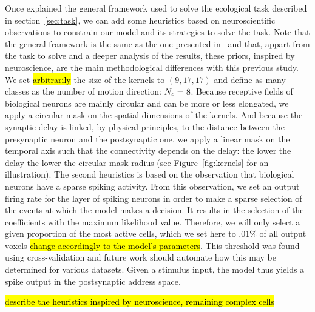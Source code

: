 \documentclass[default]{sn-jnl}%
\theoremstyle{thmstyleone}%
\theoremstyle{thmstyletwo}%
\theoremstyle{thmstylethree}%
\newcommand{\note}[1]{{\sethlcolor{yellow}\hl{#1}}}
\begin{document}
Once explained the general framework used to solve the ecological task described in section~\ref{sec:task}, we can add some heuristics based on neuroscientific observations to constrain our model and its strategies to solve the task. Note that the general framework is the same as the one presented in~\cite{grimaldi_learning_2022} and that, appart from the task to solve and a deeper analysis of the results, these priors, inspired by neuroscience, are the main methodological differences with this previous study. We set \note{arbitrarily} the size of the kernels to $(9, 17, 17)$ and define as many classes as the number of motion direction: $N_c = 8$. Because receptive fields of biological neurons are mainly circular and can be more or less elongated, we apply a circular mask on the spatial dimensions of the kernels. And because the synaptic delay is linked, by physical principles, to the distance between the presynaptic neuron and the postsynaptic one, we apply a linear mask on the temporal axis such that the connectivity depends on the delay: the lower the delay the lower the circular mask radius (see Figure~\ref{fig:kernels} for an illustration). The second heuristics is based on the observation that biological neurons have a sparse spiking activity. From this observation, we set an output firing rate for the layer of spiking neurons in order to make a sparse selection of the events at which the model makes a decision. It results in the selection of the coefficients with the maximum likelihood value. Therefore, we will only select a given proportion of the most active cells, which we set here to $.01\%$ of all output voxels \note{change accordingly to the model's parameters}. This threshold was found using cross-validation and future work should automate how this may be determined for various datasets. Given a stimulus input, the model thus yields a spike output in the postsynaptic address space.

\note{describe the heuristics inspired by neuroscience, remaining complex cells}

\end{document}
